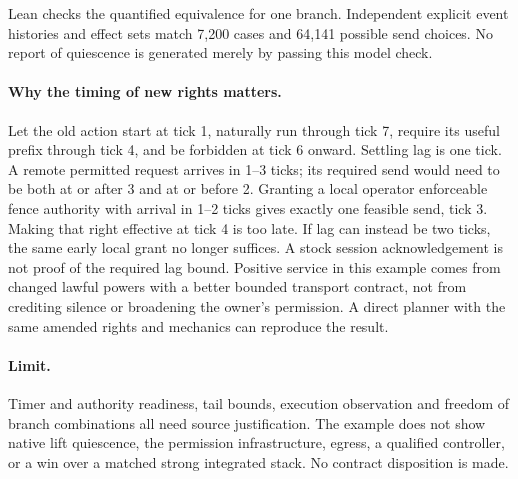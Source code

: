 \documentclass[11pt]{article}
\begin{document}
Lean checks the quantified equivalence for one branch.
Independent explicit event histories and effect sets match
7{,}200 cases and 64{,}141 possible send choices. No report of
quiescence is generated merely by passing this model check.

\paragraph{Why the timing of new rights matters.}
Let the old action start at tick 1, naturally run through
tick 7, require its useful prefix through tick 4, and be forbidden
at tick 6 onward. Settling lag is one tick. A remote permitted
request arrives in 1--3 ticks; its required send would need to
be both at or after 3 and at or before 2. Granting a local
operator enforceable fence authority with arrival in 1--2 ticks
gives exactly one feasible send, tick 3. Making that right
effective at tick 4 is too late. If lag can instead be two ticks,
the same early local grant no longer suffices. A stock session
acknowledgement is not proof of the required lag bound.
Positive service in this example comes from changed lawful
powers with a better bounded transport contract, not from
crediting silence or broadening the owner's permission.
A direct planner with the same amended rights and mechanics
can reproduce the result.

\paragraph{Limit.}
Timer and authority readiness, tail bounds, execution observation
and freedom of branch combinations all need source justification.
The example does not show native lift quiescence, the permission
infrastructure, egress, a qualified controller, or a win over a
matched strong integrated stack. No contract disposition is made.
\end{document}

